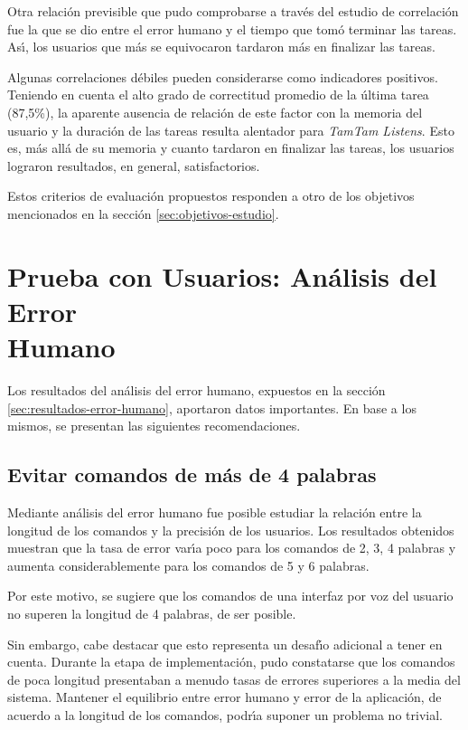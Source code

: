 Otra relaci\'on previsible que pudo comprobarse a trav\'es del estudio de correlaci\'on fue la que
se dio entre el error humano y el tiempo que tom\'o terminar las tareas. As{{\'\i}}, los usuarios que
m\'as se equivocaron tardaron m\'as en finalizar las tareas.

Algunas correlaciones d\'ebiles pueden considerarse como indicadores positivos. Teniendo en cuenta
el alto grado de correctitud promedio de la \'ultima tarea (87,5\%), la aparente ausencia de relaci\'on 
de este factor con la memoria del usuario y la duraci\'on de las tareas resulta alentador para
\emph{TamTam Listens}. Esto es, m\'as all\'a de su memoria y cuanto tardaron en finalizar las tareas,
los usuarios lograron resultados, en general, satisfactorios.

Estos criterios de evaluaci\'on propuestos responden a otro de los objetivos mencionados
en la secci\'on \ref{sec:objetivos-estudio}.

\section[Prueba con Usuarios: An\'alisis del Error Humano]
{Prueba con Usuarios: An\'alisis del Error \\ Humano}
Los resultados del an\'alisis del error humano, expuestos en la secci\'on \ref{sec:resultados-error-humano},
aportaron datos importantes. En base a los mismos, se presentan las siguientes recomendaciones.

\subsection{Evitar comandos de m\'as de 4 palabras}
Mediante an\'alisis del error humano fue posible estudiar la relaci\'on entre la longitud de los comandos
y la precisi\'on de los usuarios. Los resultados obtenidos muestran que la tasa de error
var{{\'\i}}a poco para los comandos de 2, 3, 4 palabras y aumenta considerablemente para los comandos
de 5 y 6 palabras.

Por este motivo, se sugiere que los comandos de una interfaz por voz del usuario 
no superen la longitud de 4 palabras, de ser posible.

Sin embargo, cabe destacar que esto representa un desaf{{\'\i}}o adicional a tener en cuenta.
Durante la etapa de implementaci\'on, pudo constatarse que los comandos de poca longitud presentaban
a menudo tasas de errores superiores a la media del sistema.
Mantener el equilibrio entre error humano y error de la aplicaci\'on, de acuerdo a la longitud
de los comandos, podr{{\'\i}}a suponer un problema no trivial. 

